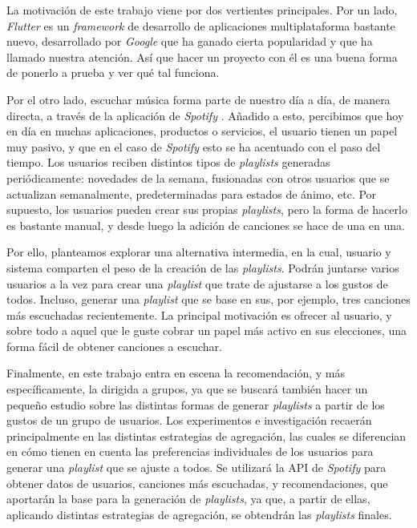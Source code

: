La motivación de este trabajo viene por dos vertientes principales. Por un lado,
\textit{Flutter} \cite{flutter} es un \textit{framework} de desarrollo de aplicaciones multiplataforma
bastante nuevo, desarrollado por \textit{Google} que ha ganado cierta popularidad
 y que ha llamado nuestra atención. Así que hacer un proyecto con él es una buena 
 forma de ponerlo a prueba y ver qué tal funciona.

 Por el otro lado, escuchar música forma parte de nuestro día a día, de manera directa,
 a través de la aplicación de \textit{Spotify} \cite{spotify}. Añadido a esto, percibimos
 que hoy en día en muchas aplicaciones, productos o servicios, el usuario tienen un papel
 muy pasivo, y que en el caso de \textit{Spotify} esto se ha acentuado con el paso del tiempo.
Los usuarios reciben distintos tipos de \textit{playlists} generadas periódicamente: novedades de la semana, 
fusionadas con otros usuarios que se actualizan semanalmente, predeterminadas para estados de ánimo, etc.
Por supuesto, los usuarios pueden crear sus propias \textit{playlists}, pero la forma de hacerlo es bastante manual, y desde luego
la adición de canciones se hace de una en una.

 Por ello, planteamos explorar una alternativa intermedia, en la cual, usuario y sistema comparten el peso de
 la creación de las \textit{playlists}. Podrán juntarse varios usuarios a la vez para crear una
 \textit{playlist} que trate de ajustarse a los gustos de todos. Incluso, generar una \textit{playlist} 
 que se base en sus, por ejemplo, tres canciones más escuchadas recientemente. La principal motivación es ofrecer al 
 usuario, y sobre todo a aquel que le guste cobrar un papel más activo en sus elecciones, una forma fácil 
 de obtener canciones a escuchar.

 Finalmente, en este trabajo entra en escena la recomendación, y más específicamente, la dirigida a grupos,
 ya que se buscará también hacer un pequeño estudio sobre las distintas formas de generar \textit{playlists} a partir de los
 gustos de un grupo de usuarios. Los experimentos e investigación recaerán principalmente en las distintas estrategias de agregación, las cuales 
 se diferencian en cómo tienen en cuenta las preferencias individuales de los usuarios para generar una \textit{playlist} que se ajuste a todos.
Se utilizará la API de \textit{Spotify} \cite{spotify_api} para obtener datos de usuarios, 
 canciones más escuchadas, y recomendaciones, que aportarán la base para la generación de \textit{playlists}, ya que, a partir de ellas, aplicando
 distintas estrategias de agregación, se obtendrán las \textit{playlists} finales.